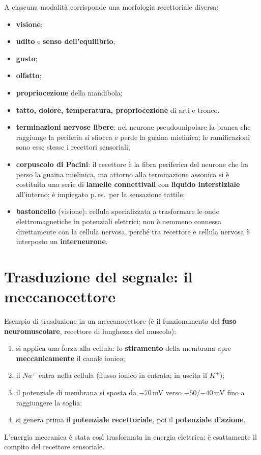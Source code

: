 A ciascuna modalità corrisponde una morfologia recettoriale diversa:
\begin{itemize}
  \item \textbf{visione};
  \item \textbf{udito} e \textbf{senso dell'equilibrio};
  \item \textbf{gusto};
  \item \textbf{olfatto};
  \item \textbf{propriocezione} della mandibola;
  \item \textbf{tatto, dolore, temperatura, propriocezione} di arti e tronco.
\end{itemize}

\begin{itemize}
  \item \textbf{terminazioni nervose libere}: nel neurone pseudounipolare la branca che raggiunge
    la periferia si sfiocca e perde la guaina mielinica; le ramificazioni sono esse stesse i
    recettori sensoriali;
  \item \textbf{corpuscolo di Pacini}: il recettore è la fibra periferica del neurone che ha perso
    la guaina mielinica, ma attorno alla terminazione assonica si è costituita una serie di
    \textbf{lamelle connettivali} con \textbf{liquido interstiziale} all'interno; è impiegato
    p.\,es.\ per la sensazione tattile;
  \item \textbf{bastoncello} (visione): cellula specializzata a trasformare le onde
    elettromagnetiche in potenziali elettrici; non è nemmeno connessa direttamente con la cellula
    nervosa, perché tra recettore e cellula nervosa è interposto un \textbf{interneurone}.
\end{itemize}

\section{Trasduzione del segnale: il meccanocettore}

Esempio di trasduzione in un meccanocettore (è il funzionamento del \textbf{fuso neuromuscolare},
recettore di lunghezza del muscolo):
\begin{enumerate}
  \item si applica una forza alla cellula: lo \textbf{stiramento} della membrana apre
    \textbf{meccanicamente} il canale ionico;
  \item il $Na^+$ entra nella cellula (flusso ionico in entrata; in uscita il $K^+$);
  \item il potenziale di membrana si sposta da $-70$\,mV verso $-50$/$-40$\,mV fino a raggiungere
    la soglia;
  \item si genera prima il \textbf{potenziale recettoriale}, poi il \textbf{potenziale d'azione}.
\end{enumerate}
L'energia meccanica è stata così trasformata in energia elettrica: è esattamente il compito del
recettore sensoriale.


